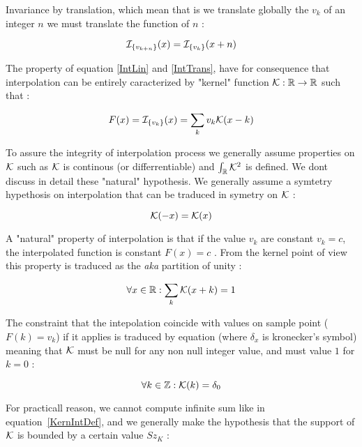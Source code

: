 Invariance by translation, which mean that is we translate globally the $v_k$ of an integer $n$
we must translate the function of $n$ :

\begin{equation}
    \mathcal I_{\{v_{k+n}\}}(x) =  \mathcal I_{\{v_{k}\}}(x+n)  \label{IntTrans}
\end{equation}

The property of equation \ref{IntLin} and \ref{IntTrans}, have for consequence that interpolation
can be entirely caracterized by "kernel" function $\mathcal K : \mathbb{R} \rightarrow \mathbb{R} $ such that :

\begin{equation}
    F(x) =  \mathcal I_{\{v_{k}\}}(x) = \sum_{k}  v_k  \mathcal K(x-k)   \label{KernIntDef}
\end{equation}

To assure the  integrity of interpolation process we generally assume properties on $\mathcal K$
such as $\mathcal K$ is continous (or differrentiable) and  $\int_{\mathbb{R}} \mathcal K ^2 $ is defined. We dont
discuss in detail these "natural" hypothesis.
We generally assume a symtetry hypethosis on interpolation that can be traduced in symetry on
$\mathcal K$ :

\begin{equation}
    \mathcal K(-x) =   \mathcal K(x)   \label{KernIntSym}
\end{equation}


A "natural" property of interpolation is that if the value $v_k$ are constant $v_k=c$, the interpolated function 
is constant $F(x)=c$ . From the kernel point of view this property is traduced as the \emph{aka} partition of unity :

\begin{equation}
    \forall x \in \mathbb{R} : \sum_k \mathcal K(x+k) =   1 \label{PartUnit}
\end{equation}


The constraint that the intepolation coincide with values on sample point ($F(k)=v_k$) if it
applies  is traduced by equation (where $\delta_x$ is kronecker's symbol) meaning that $ \mathcal K$ must
be null for any non null integer value, and must value $1$ for $k=0$ :

\begin{equation}
    \forall k \in \mathbb{Z} :  \mathcal K(k) =   \delta_0 \label{KernIntDelta0}
\end{equation}

For practicall reason, we cannot compute infinite sum like in equation~\ref{KernIntDef}, and we 
generally make the hypothesis that the support of $\mathcal K$ is bounded by a certain value $Sz_K$ :


